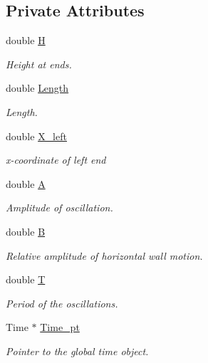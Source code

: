 \subsection*{Private Attributes}
\begin{DoxyCompactItemize}
\item 
double \hyperlink{classOscillatingWall_aa587e944cac9e501e6d3323731145b95}{H}
\begin{DoxyCompactList}\small\item\em Height at ends. \end{DoxyCompactList}\item 
double \hyperlink{classOscillatingWall_ac5e2ad6d5ef2992ba9295118787190e6}{Length}
\begin{DoxyCompactList}\small\item\em Length. \end{DoxyCompactList}\item 
double \hyperlink{classOscillatingWall_a71a60ee3294746875a24aeeffb38f7ec}{X\+\_\+left}
\begin{DoxyCompactList}\small\item\em x-\/coordinate of left end \end{DoxyCompactList}\item 
double \hyperlink{classOscillatingWall_ac22b6ac70a42850ddbe2e9c4c16f4664}{A}
\begin{DoxyCompactList}\small\item\em Amplitude of oscillation. \end{DoxyCompactList}\item 
double \hyperlink{classOscillatingWall_a9db810649987a2011c7fe14d10b98b9a}{B}
\begin{DoxyCompactList}\small\item\em Relative amplitude of horizontal wall motion. \end{DoxyCompactList}\item 
double \hyperlink{classOscillatingWall_af33b31988c823d33a3b147281ec94599}{T}
\begin{DoxyCompactList}\small\item\em Period of the oscillations. \end{DoxyCompactList}\item 
Time $\ast$ \hyperlink{classOscillatingWall_a9c4bea6ec6e80ba23139cd5a1d4d25d5}{Time\+\_\+pt}
\begin{DoxyCompactList}\small\item\em Pointer to the global time object. \end{DoxyCompactList}\end{DoxyCompactItemize}


